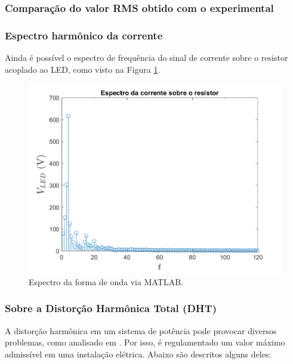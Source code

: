 \documentclass[a4paper,12pt,oneside,openany,table,xcdraw]{article}
\begin{document}
\subsubsection{Comparação do valor RMS obtido com o experimental}

\subsubsection{Espectro harmônico da corrente}

Ainda é possível o espectro de frequência do sinal de corrente sobre o resistor acoplado ao LED, como visto na Figura \ref{m1:matlab:espectro}.

\vspace{0.6cm}
\begin{figure}[H]
\centering
\includegraphics[width=13cm]{Espectro_IN}
\caption{Espectro da forma de onda via MATLAB.}
\label{m1:matlab:espectro}
\end{figure}
\vspace{0.1cm}

\subsubsection{Sobre a Distorção Harmônica Total (DHT)}
A distorção harmônica em um sistema de potência pode provocar diversos problemas, como analisado em \cite{dht}. Por isso, é regulamentado um valor máximo admissível em uma instalação elétrica. Abaixo são descritos alguns deles:
\end{document}
